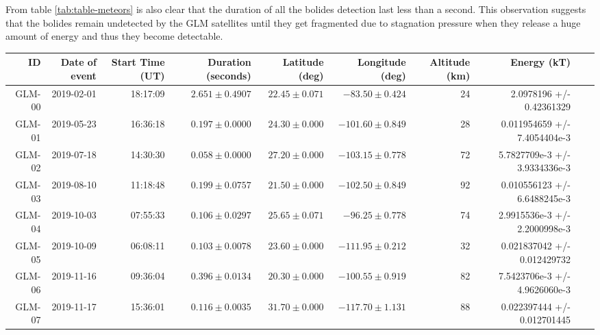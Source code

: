 From table \ref{tab:table-meteors} is also clear that the duration of all the bolides detection last less than a second. This observation suggests that the bolides remain undetected by the GLM satellites until they get fragmented due to stagnation pressure when they release a huge amount of energy and thus they become detectable.



\begin{table*}
  \centering
  \footnotesize
  \caption{List of bolides detected in mexican territory (plus one detected near Venezuela and one detected near Cuba), detected by the Geostationary Lighning mapper. The events are listed in chronological order. The listed duration, latitude and longitude correspond to the mean of the measurements of both GOES satellites. The uncertainties correspond to the respecting mean deviation.}
\label{tab:table-meteors}
\begin{tabular}{rrrrrrrrrr}
\hline
ID & Date of event  & Start Time (UT)  & Duration (seconds) & Latitude (deg) & Longitude (deg)& Altitude (km) & Energy (kT)\\\hline
GLM-00 & 2019-02-01 & 18:17:09 & $2.651\pm 0.4907$ & $22.45 \pm 0.071$ & $-83.50  \pm  0.424$ & 24           & 2.0978196 +/- 0.42361329      \\         
GLM-01 & 2019-05-23 & 16:36:18 & $0.197\pm 0.0000$ & $24.30 \pm 0.000$ & $-101.60 \pm  0.849$ & 28           & 0.011954659 +/- 7.4054404e-3  \\
GLM-02 & 2019-07-18 & 14:30:30 & $0.058\pm 0.0000$ & $27.20 \pm 0.000$ & $-103.15 \pm  0.778$ & 72           & 5.7827709e-3 +/- 3.9334336e-3 \\
GLM-03 & 2019-08-10 & 11:18:48 & $0.199\pm 0.0757$ & $21.50 \pm 0.000$ & $-102.50  \pm 0.849$ & 92           & 0.010556123 +/- 6.6488245e-3  \\
GLM-04 & 2019-10-03 & 07:55:33 & $0.106\pm 0.0297$ & $25.65 \pm 0.071$ & $-96.25 \pm   0.778$ & 74           & 2.9915536e-3 +/- 2.2000998e-3 \\
GLM-05 & 2019-10-09 & 06:08:11 & $0.103\pm 0.0078$ & $23.60 \pm 0.000$ & $-111.95 \pm  0.212$ & 32           & 0.021837042 +/- 0.012429732   \\
GLM-06 & 2019-11-16 & 09:36:04 & $0.396\pm 0.0134$ & $20.30 \pm 0.000$ & $-100.55 \pm  0.919$ & 82           & 7.5423706e-3 +/- 4.9626060e-3 \\
GLM-07 & 2019-11-17 & 15:36:01 & $0.116\pm 0.0035$ & $31.70 \pm 0.000$ & $-117.70 \pm  1.131$ & 88           & 0.022397444 +/- 0.012701445   \\

\end{tabular}
\end{table*}
